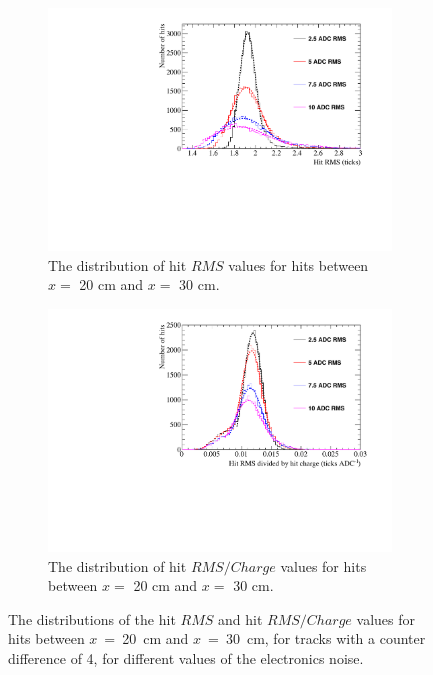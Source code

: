 \begin{figure}
  \centering
  \begin{subfigure}{0.48\textwidth}
    \centering
    \includegraphics[width=\textwidth]{Canvas_RMS_20cm_NoiseLevel}
    \caption{The distribution of hit $RMS$ values for hits between $x =$ 20 cm and $x =$ 30 cm.}
  \end{subfigure}%
  \hspace{0.03\textwidth}%
  \begin{subfigure}{0.48\textwidth}
    \centering
    \includegraphics[width=\textwidth]{Canvas_RMS_Q_20cm_NoiseLevel}
    \caption{The distribution of hit $RMS/Charge$ values for hits between $x =$ 20 cm and $x =$ 30 cm.}
  \end{subfigure}
  \caption[The distributions of the hit $RMS$ and hit $RMS/Charge$ values for tracks with a counter difference of 4, for different values of the electronics noise]
          {The distributions of the hit $RMS$ and hit $RMS/Charge$ values for hits between $x$~=~20~cm and $x$~=~30~cm, for tracks with a counter difference of 4, for different values of the electronics noise.}
  \label{fig:DiffNoiseStudy_HitFit}
\end{figure}

